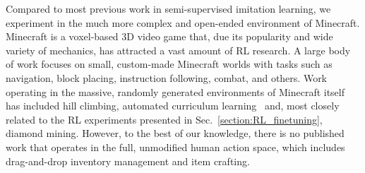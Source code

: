 Compared to most previous work in semi-supervised imitation learning, we experiment in the much more complex and open-ended environment of Minecraft. Minecraft is a voxel-based 3D video game that, due its popularity and wide variety of mechanics, has attracted a vast amount of RL research.\cite{guss2019minerl, tessler2017deep, kanitscheider2021multi, oh2016control, abel2016exploratory, arumugam2019deep, trott2019keeping, alaniz2018deep, udagawa2016fighting, shu2017hierarchical, oh2017zero, shi2022learning, matiisen2019teacher, patil2020align, skrynnik2020forgetful, lin2021juewu}
A large body of work focuses on small, custom-made Minecraft worlds with tasks such as navigation,\cite{arumugam2019deep, matiisen2019teacher} block placing,\cite{trott2019keeping, alaniz2018deep} instruction following,\cite{oh2017zero, shi2022learning} combat,\cite{udagawa2016fighting} and others.\cite{oh2016control, tessler2017deep, shu2017hierarchical}
Work operating in the massive, randomly generated environments of Minecraft itself has included hill climbing,\cite{abel2016exploratory} automated curriculum learning~\cite{kanitscheider2021multi} and, most closely related to the RL experiments presented in Sec.~\ref{section:RL_finetuning}, diamond mining.\cite{guss2019minerl, patil2020align, skrynnik2020forgetful, lin2021juewu}
However, to the best of our knowledge, there is no published work that operates in the full, unmodified human action space, which includes drag-and-drop inventory management and item crafting.